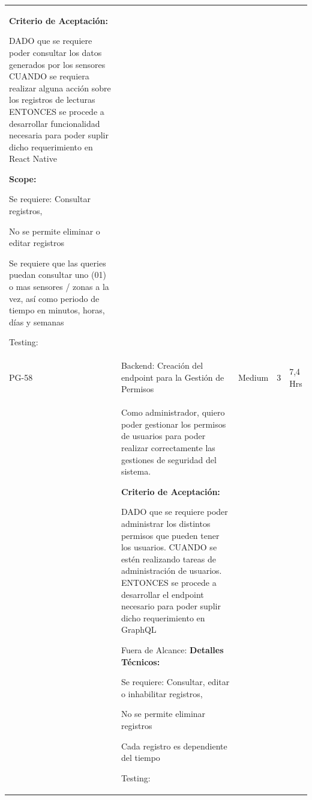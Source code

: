\documentclass[11pt]{charter}
\begin{document}
\begin{landscape}
\begin{tabularx}{\linewidth}{@{}|p{1.3cm}|p{17cm}|p{1.7cm}|p{1.5cm}|p{1.7cm}|@{}}
\begin{description}
                   \item \textbf{Criterio de Aceptación:}                 
                   \item DADO que se requiere poder consultar los datos generados por los   sensores CUANDO se requiera realizar alguna acción sobre los registros de   lecturas ENTONCES se procede a desarrollar funcionalidad necesaria para poder suplir dicho requerimiento en React Native                
                   \item \textbf{Scope:}                  
                         \item Se requiere: Consultar registros, 
                         \item No se permite eliminar o editar registros 
                         \item Se requiere que las queries puedan consultar uno (01) o mas sensores /   zonas a la vez, así como periodo de tiempo en minutos, horas, días y   semanas                 
                   \item Testing:
            \end{description}   &  &     & \\
PG-58    & Backend: Creación del endpoint   para la Gestión de Permisos       & Medium             & 3   & 7,4  Hrs          \\
         &  \begin{description}                 
                   \item Como administrador, quiero poder   gestionar los permisos de usuarios para poder realizar correctamente las   gestiones de seguridad del sistema.                 
                   \item \textbf{Criterio de Aceptación:}                 
                   \item DADO que se requiere poder administrar los distintos permisos que pueden   tener los usuarios. CUANDO se estén realizando tareas de administración de usuarios. ENTONCES se procede a desarrollar el endpoint necesario para poder suplir dicho requerimiento en GraphQL             
                   \item Fuera de Alcance:                 
                   \textbf{Detalles Técnicos:} 
                         \item Se requiere: Consultar, editar o inhabilitar registros, 
                         \item No se permite eliminar registros 
                         \item Cada registro es dependiente del tiempo                 
                   \item Testing:                 
            \end{description}        &  &     & \\


\end{tabularx}
\end{landscape}
\end{document}
